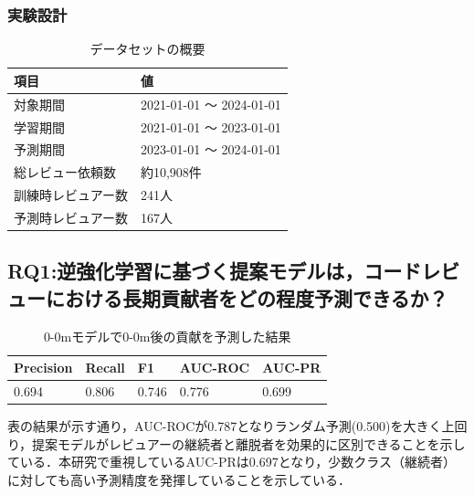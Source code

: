 \documentclass[submit,techrep,noauthor]{ipsj}
\begin{document}
\subsubsection{実験設計}
\begin{table}[h]
    \centering
    \caption{データセットの概要}
    \begin{tabularx}{\columnwidth}{XX}
        \hline
        項目 & 値 \\
        \hline
        対象期間 & 2021-01-01 ～ 2024-01-01 \\
        学習期間 & 2021-01-01 ～ 2023-01-01 \\
        予測期間 & 2023-01-01 ～ 2024-01-01 \\
        \hline
        総レビュー依頼数 & 約10,908件 \\
        訓練時レビュアー数 & 241人 \\
        予測時レビュアー数 & 167人 \\
        \hline
    \end{tabularx}
    \label{table:dataset}
\end{table}




\subsection{RQ1:逆強化学習に基づく提案モデルは，コードレビューにおける長期貢献者をどの程度予測できるか？}
\begin{table}[h]
    \centering
    \caption{0-0mモデルで0-0m後の貢献を予測した結果}
    \begin{tabularx}{\columnwidth}{XXXXX}
        \hline
       Precision & Recall & F1 & AUC-ROC & AUC-PR \\
       \hline
       0.694  & 0.806 & 0.746 & 0.776 & 0.699 \\ 
       \hline
    \end{tabularx}
\end{table}
表の結果が示す通り，AUC-ROCが0.787となりランダム予測(0.500)を大きく上回り，提案モデルがレビュアーの継続者と離脱者を効果的に区別できることを示している．本研究で重視しているAUC-PRは0.697となり，少数クラス（継続者）に対しても高い予測精度を発揮していることを示している．
\end{document}
